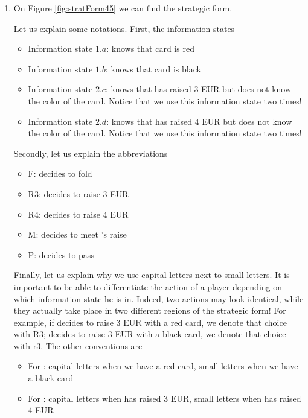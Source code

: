 \begin{enumerate}[label=\alph*.]

	\item On Figure \ref{fig:stratForm45} we can find the strategic form.

	      


	      Let us explain some notations. First, the information states
	      \begin{itemize}
	      	\item Information state $1.a$: \TAone{} knows that card is red
	      	\item Information state $1.b$: \TAone{} knows that card is black
	      	\item Information state $2.c$: \TAtwo{} knows that \TAone{} has raised 3 EUR but \TAtwo{} does not know the color of the card. Notice that we use this information state two times!
	      	\item Information state $2.d$: \TAtwo{} knows that \TAone{} has raised 4 EUR but \TAtwo{} does not know the color of the card. Notice that we use this information state two times!
	      \end{itemize}

	      Secondly, let us explain the abbreviations
	      \begin{itemize}
	      	\item F: \TAone{} decides to fold
	      	\item R3: \TAone{} decides to raise 3 EUR
	      	\item R4: \TAone{} decides to raise 4 EUR
	      	\item M: \TAtwo{} decides to meet \TAone{}'s raise
	      	\item P: \TAtwo{} decides to pass
	      \end{itemize}

	      Finally, let us explain why we use capital letters next to small letters. It is important to be able to differentiate the action of a player depending on which information state he is in. Indeed, two actions may look identical, while they actually take place in two different regions of the strategic form! For example, if \TAone{} decides to raise 3 EUR with a red card, we denote that choice with R3; \TAone{} decides to raise 3 EUR with a black card, we denote that choice with r3. The other conventions are
	      \begin{itemize}
	      	\item For \TAone{}: capital letters when we have a red card, small letters when we have a black card
	      	\item For \TAtwo{}: capital letters when \TAone{} has raised 3 EUR, small letters when \TAone{} has raised 4 EUR
	      \end{itemize}






\end{enumerate}
